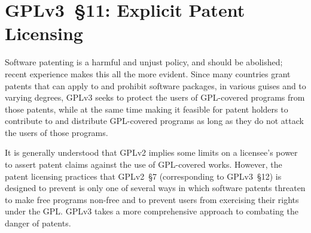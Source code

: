 

\section{GPLv3~\S11: Explicit Patent Licensing}
\label{GPLv3s11}

Software patenting is a harmful and unjust policy, and should be abolished;
recent experience makes this all the more evident. Since many countries grant
patents that can apply to and prohibit software packages, in various guises
and to varying degrees, GPLv3 seeks to protect the users of GPL-covered programs
from those patents, while at the same time making it feasible for patent
holders to contribute to and distribute GPL-covered programs as long as they
do not attack the users of those programs.

It is generally understood that GPLv2 implies some limits on a licensee's
power to assert patent claims against the use of GPL-covered works.
However, the patent licensing practices that GPLv2~\S7 (corresponding to
GPLv3~\S12) is designed to prevent is only one of several ways in which
software patents threaten to make free programs non-free and to prevent users
from exercising their rights under the GPL. GPLv3 takes a more comprehensive
approach to combating the danger of patents.

